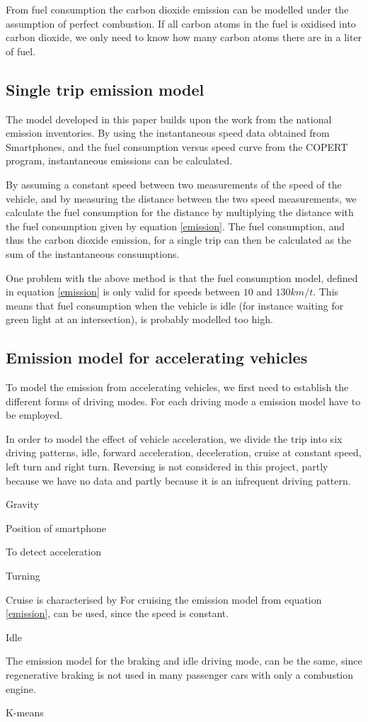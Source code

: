 From fuel consumption the carbon dioxide emission can be modelled under the assumption of perfect combustion. If all carbon atoms in the fuel is oxidised into carbon dioxide, we only need to know how many carbon atoms there are in a liter of fuel.

\subsection{Single trip emission model}
The model developed in this paper builds upon the work from the national emission inventories. By using the instantaneous speed data obtained from Smartphones, and the fuel consumption versus speed curve from the COPERT program, instantaneous emissions can be calculated.

By assuming a constant speed between two measurements of the speed of the vehicle, and by measuring the distance between the two speed measurements, we calculate the fuel consumption for the distance by multiplying the distance with the fuel consumption given by equation \ref{emission}. The fuel consumption, and thus the carbon dioxide emission, for a single trip can then be calculated as the sum of the instantaneous consumptions.

One problem with the above method is that the fuel consumption model, defined in equation \ref{emission} is only valid for speeds between $10$ and $130 km/t$. This means that fuel consumption when the vehicle is idle (for instance waiting for green light at an intersection), is probably modelled too high.


\subsection{Emission model for accelerating vehicles}

To model the emission from accelerating vehicles, we first need to establish the different forms of driving modes. For each driving mode a emission model have to be employed.

In order to model the effect of vehicle acceleration, we divide the trip into six driving patterns, idle, forward acceleration, deceleration, cruise at constant speed, left turn and right turn. Reversing is not considered in this project, partly because we have no data and partly because it is an infrequent driving pattern. 

Gravity 

Position of smartphone

To detect acceleration


Turning

Cruise is characterised by
 For cruising the emission model from equation \ref{emission}, can be used, since the speed is constant.

Idle

The emission model for the braking and idle driving mode, can be the same, since regenerative braking is not used in many passenger cars with only a combustion engine.

K-means



 